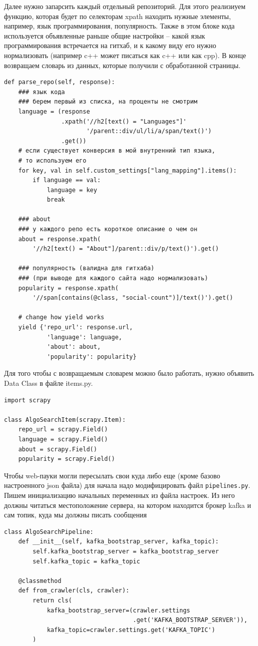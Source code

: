 Далее нужно запарсить каждый отдельный репозиторий. Для этого реализиуем
функцию, которая будет по селекторам xpath находить нужные элементы, например,
язык программирования, популярность. Также в этом блоке кода используется
объявленные раньше общие настройки -- какой язык программирования встречается на
гитхаб, и к какому виду его нужно нормализовать (например c++ может писаться как
c++ или как cpp). В конце возвращаем словарь из данных, которые получили с
обработанной страницы.
\begin{verbatim}
def parse_repo(self, response):
    ### язык кода
    ### берем первый из списка, на проценты не смотрим
    language = (response
                .xpath('//h2[text() = "Languages"]'
                       '/parent::div/ul/li/a/span/text()')
                .get())
    # если существует конверсия в мой внутренний тип языка,
    # то используем его
    for key, val in self.custom_settings["lang_mapping"].items():
        if language == val:
            language = key
            break

    ### about
    ### у каждого репо есть короткое описание о чем он
    about = response.xpath(
        '//h2[text() = "About"]/parent::div/p/text()').get()

    ### популярность (валидна для гитхаба)
    ### (при выводе для каждого сайта надо нормализовать)
    popularity = response.xpath(
        '//span[contains(@class, "social-count")]/text()').get()

    # change how yield works
    yield {'repo_url': response.url,
            'language': language,
            'about': about,
            'popularity': popularity}
\end{verbatim}

Для того чтобы с возвращаемым словарем можно было работать, нужно объявить Data
Class в файле items.py.
\begin{verbatim}
import scrapy

class AlgoSearchItem(scrapy.Item):
    repo_url = scrapy.Field()
    language = scrapy.Field()
    about = scrapy.Field()
    popularity = scrapy.Field()
\end{verbatim}

Чтобы web-пауки могли пересылать свои куда либо еще (кроме базово настроенного
json файла) для начала надо модифицировать файл \verb|pipelines.py|. Пишем
инициализацию начальных переменных из файла настроек. Из него должны читаться
местоположение сервера, на котором находится брокер kafka и сам топик, куда мы
должны писать сообщения
\begin{verbatim}
class AlgoSearchPipeline:
    def __init__(self, kafka_bootstrap_server, kafka_topic):
        self.kafka_bootstrap_server = kafka_bootstrap_server
        self.kafka_topic = kafka_topic

    @classmethod
    def from_crawler(cls, crawler):
        return cls(
            kafka_bootstrap_server=(crawler.settings
                                    .get('KAFKA_BOOTSTRAP_SERVER')),
            kafka_topic=crawler.settings.get('KAFKA_TOPIC')
        )
\end{verbatim}

